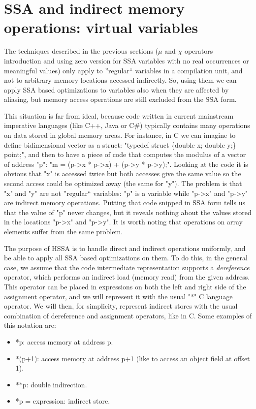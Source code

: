 \section{SSA and indirect memory operations: virtual variables}

The techniques described in the previous sections ($\mu$ and $\chi$ operators introduction and using zero version for SSA variables with no real occurrences or meaningful values) only apply to ''regular`` variables in a compilation unit, and not to arbitrary memory locations accessed indirectly.
So, using them we can apply SSA based optimizations to variables also when they are affected by aliasing, but memory access operations are still excluded from the SSA form.

This situation is far from ideal, because code written in current mainstream imperative languages (like C++, Java or C\#) typically contains many operations on data stored in global memory areas.
For instance, in C we can imagine to define bidimensional vector as a struct: "typedef struct \{double x; double y;\} point;", and then to have a piece of code that computes the modulus of a vector of address "p": "m = (p->x * p->x) + (p->y * p->y);".
Looking at the code it is obvious that "x" is accessed twice but both accesses give the same value so the second access could be optimized away (the same for "y").
The problem is that "x" and "y" are not ''regular`` variables: "p" is a variable while "p->x" and "p->y" are indirect memory operations.
Putting that code snipped in SSA form tells us that the value of "p" never changes, but it reveals nothing about the values stored in the locations "p->x" and "p->y".
It is worth noting that operations on array elements suffer from the same problem.

The purpose of HSSA is to handle direct and indirect operations uniformly, and be able to apply all SSA based optimizations on them.
To do this, in the general case, we assume that the code intermediate representation supports a {\em dereference} operator, which performs an indirect load (memory read) from the given address. This operator can be placed in expressions on both the left and right side of the assignment operator, and we will represent it with the usual "*" C language operator. We will then, for simplicity, represent indirect stores with the usual combination of dereference and assignment operators, like in C.
Some examples of this notation are:
\begin{itemize}
\item *p: access memory at address p.
\item *(p+1): access memory at address p+1 (like to access an object field at offset 1).
\item **p: double indirection.
\item *p = expression: indirect store.
\end{itemize}

